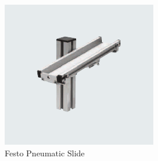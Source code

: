 \begin{figure}[H]
	\begin{center}
		\includegraphics[scale=.50]{media/FestoStation_PneumaticSlide.png} 	
		\caption{Festo Pneumatic Slide}
		\label{fig:festostationpneumaticslide}
	\end{center}
\end{figure}

